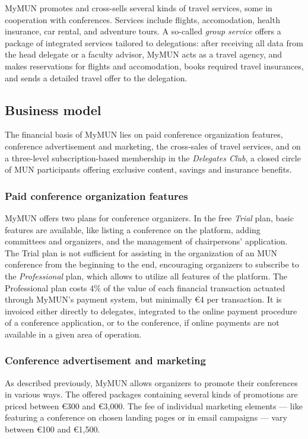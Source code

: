MyMUN promotes and cross-sells several kinds of travel services, some in cooperation with conferences. Services include flights, accomodation, health insurance, car rental, and adventure tours. A so-called \emph{group service} offers a package of integrated services tailored to delegations: after receiving all data from the head delegate or a faculty advisor, MyMUN acts as a travel agency, and makes reservations for flights and accomodation, books required travel insurances, and sends a detailed travel offer to the delegation.

\subsection{Business model}

The financial basis of MyMUN lies on paid conference organization features, conference advertisement and marketing, the cross-sales of travel services, and on a three-level subscription-based membership in the \emph{Delegates Club}, a closed circle of MUN participants offering exclusive content, savings and insurance benefits.

\subsubsection{Paid conference organization features}

MyMUN offers two plans for conference organizers. In the free \emph{Trial} plan, basic features are available, like listing a conference on the platform, adding committees and organizers, and the management of chairpersons' application. The Trial plan is not sufficient for assisting in the organization of an MUN conference from the beginning to the end, encouraging organizers to subscribe to the \emph{Professional} plan, which allows to utilize all features of the platform. The Professional plan costs 4\% of the value of each financial transaction actuated through MyMUN's payment system, but minimally €4 per transaction. It is invoiced either directly to delegates, integrated to the online payment procedure of a conference application, or to the conference, if online payments are not available in a given area of operation.

\subsubsection{Conference advertisement and marketing}

As described previously, MyMUN allows organizers to promote their conferences in various ways. The offered packages containing several kinds of promotions are priced between €300 and €3,000. The fee of individual marketing elements — like featuring a conference on chosen landing pages or in email campaigns — vary between €100 and €1,500.

